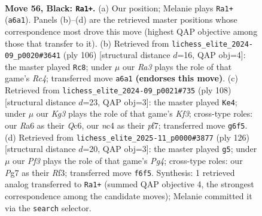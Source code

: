 \documentclass[11pt]{article}
\begin{document}
\clearpage

\begin{figure}[p]\centering
\begin{subfigure}{0.46\textwidth}\centering
\resizebox{\linewidth}{!}{%
\newchessgame
\chessboard[
  setfen={1R6/6p1/r4pk1/7p/2NP3P/6P1/8/6K1 b - - 6 56},
  showmover=false,
  pgfstyle=straightmove, color=movearrow, markmove={a6-a1}
]}
\caption{}
\end{subfigure}\hfill
\begin{subfigure}{0.46\textwidth}\centering
\resizebox{\linewidth}{!}{%
\newchessgame
\chessboard[
  setfen={8/8/1r3kp1/7p/2R4P/5PK1/6P1/8 w - - 4 54},
  showmover=false,
  pgfstyle=straightmove, color=movearrow, markmove={c4-c8}
]}
\caption{}
\end{subfigure}
\\[4pt]
\begin{subfigure}{0.46\textwidth}\centering
\resizebox{\linewidth}{!}{%
\newchessgame
\chessboard[
  setfen={3k4/5p2/2Q5/6p1/6Pp/4PK1P/5P2/8 w - - 5 55},
  showmover=false,
  pgfstyle=straightmove, color=movearrow, markmove={f3-e4}
]}
\caption{}
\end{subfigure}\hfill
\begin{subfigure}{0.46\textwidth}\centering
\resizebox{\linewidth}{!}{%
\newchessgame
\chessboard[
  setfen={8/6pk/5p2/5P2/4PKP1/5R2/8/r7 w - - 5 64},
  showmover=false,
  pgfstyle=straightmove, color=movearrow, markmove={g4-g5}
]}
\caption{}
\end{subfigure}
\caption{\textbf{Move 56, Black: \texttt{Ra1+}.} (a) Our position; Melanie plays \texttt{Ra1+} (\texttt{a6a1}). Panels (b)--(d) are the retrieved master positions whose correspondence most drove this move (highest QAP objective among those that transfer to it). (b) Retrieved from \texttt{lichess\_elite\_2024-09\_p0020\#3641} (ply 106) [structural distance $d$=16, QAP obj=4]: the master played \texttt{Rc8}; under $\mu$ our \emph{Ra3} plays the role of that game's \emph{Rc4}; transferred move \texttt{a6a1} \textbf{(endorses this move)}. (c) Retrieved from \texttt{lichess\_elite\_2024-09\_p0021\#735} (ply 108) [structural distance $d$=23, QAP obj=3]: the master played \texttt{Ke4}; under $\mu$ our \emph{Kg3} plays the role of that game's \emph{Kf3}; cross-type roles: our \emph{R}a6 as their \emph{Q}c6, our \emph{n}c4 as their \emph{p}f7; transferred move \texttt{g6f5}. (d) Retrieved from \texttt{lichess\_elite\_2025-11\_p0000\#3877} (ply 126) [structural distance $d$=20, QAP obj=3]: the master played \texttt{g5}; under $\mu$ our \emph{Pf3} plays the role of that game's \emph{Pg4}; cross-type roles: our \emph{P}g7 as their \emph{R}f3; transferred move \texttt{f6f5}. Synthesis: 1 retrieved analog transferred to \texttt{Ra1+} (summed QAP objective 4, the strongest correspondence among the candidate moves); Melanie committed it via the \texttt{search} selector.}
\label{fig:thought-m111}
\end{figure}
\end{document}
